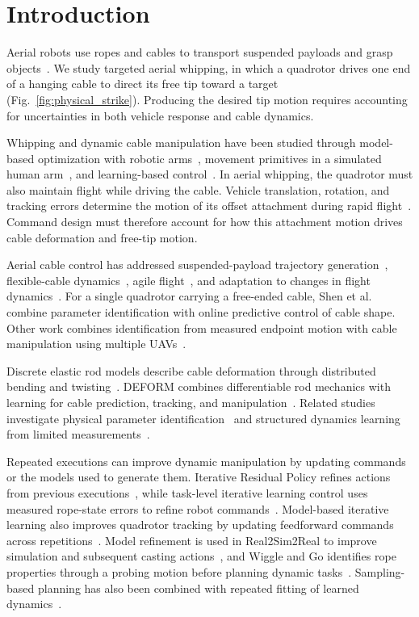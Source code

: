 \documentclass[letterpaper, 10 pt, conference]{ieeeconf}
\begin{document}
\IEEEpeerreviewmaketitle


\section{Introduction}
\label{sec:introduction}

Aerial robots use ropes and cables to transport suspended
payloads and grasp objects~\cite{sreenath2013trajectory,hitch}.
We study targeted aerial whipping, in which a quadrotor drives
one end of a hanging cable to direct its free tip toward a
target (Fig.~\ref{fig:physical_strike}). Producing the desired tip
motion requires accounting for uncertainties in both vehicle
response and cable dynamics.

Whipping and dynamic cable manipulation have been studied through
model-based optimization with robotic
arms~\cite{zimmermann2021dynamic}, movement primitives in a
simulated human arm~\cite{nah2023learning}, and learning-based
control~\cite{wang2024learning}. In aerial whipping, the quadrotor
must also maintain flight while driving the cable. Vehicle
translation, rotation, and tracking errors determine the motion
of its offset attachment during rapid
flight~\cite{torrente2021data}. Command design must therefore
account for how this attachment motion drives cable deformation
and free-tip motion.

Aerial cable control has addressed suspended-payload trajectory
generation~\cite{sreenath2013trajectory}, flexible-cable
dynamics~\cite{8308004}, agile flight~\cite{cao2026flare}, and
adaptation to changes in flight dynamics~\cite{belkhale2021model}.
For a single quadrotor carrying a free-ended cable, Shen
et al.~\cite{shen2025aerial} combine parameter identification with
online predictive control of cable shape. Other work combines
identification from measured endpoint motion with cable
manipulation using multiple UAVs~\cite{gabellieri2025manipulation}.

Discrete elastic rod models describe cable deformation through
distributed bending and twisting~\cite{bergou2008discrete}.
DEFORM combines differentiable rod mechanics with learning for
cable prediction, tracking, and
manipulation~\cite{pmlr-v270-chen25d}. Related studies investigate
physical parameter identification~\cite{chen2025accurate} and
structured dynamics learning from limited
measurements~\cite{mamedov2025learning}.

Repeated executions can improve dynamic manipulation by updating
commands or the models used to generate them. Iterative Residual
Policy refines actions from previous
executions~\cite{chi2024iterative}, while task-level iterative
learning control uses measured rope-state errors to refine robot
commands~\cite{suresh2026learning}. Model-based iterative learning
also improves quadrotor tracking by updating feedforward commands
across repetitions~\cite{schoellig2012optimization}.
Model refinement is used in Real2Sim2Real to improve simulation
and subsequent casting actions~\cite{lim2022real2sim2real}, and
Wiggle and Go identifies rope properties through a probing motion
before planning dynamic tasks~\cite{jakobsson2026wiggle}.
Sampling-based planning has also been combined with repeated
fitting of learned dynamics~\cite{williams2017information}.
\end{document}
